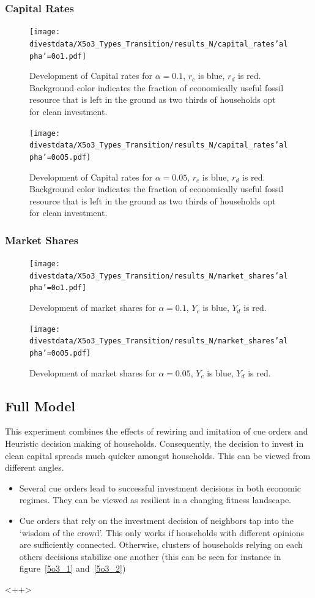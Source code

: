 \subsubsection{Capital Rates}
\begin{figure}[H]
	\centering
	\texttt{[image: divestdata/X5o3\_Types\_Transition/results\_N/capital\_rates'alpha'=0o1.pdf]}
	\caption{Development of Capital rates for $\alpha=0.1$, $r_c$ is blue, $r_d$ is red. Background color indicates the fraction of economically useful fossil resource that is left in the ground as two thirds of households opt for clean investment.}
	\label{5o3_3}
\end{figure}

\begin{figure}[H]
	\centering
	\texttt{[image: divestdata/X5o3\_Types\_Transition/results\_N/capital\_rates'alpha'=0o05.pdf]}
	\caption{Development of Capital rates for $\alpha=0.05$, $r_c$ is blue, $r_d$ is red. Background color indicates the fraction of economically useful fossil resource that is left in the ground as two thirds of households opt for clean investment.}

\end{figure}
\subsubsection{Market Shares}
\begin{figure}[H]
	\centering
	\texttt{[image: divestdata/X5o3\_Types\_Transition/results\_N/market\_shares'alpha'=0o1.pdf]}
	\caption{Development of market shares for $\alpha=0.1$, $Y_c$ is blue, $Y_d$ is red.}

\end{figure}

\begin{figure}[H]
	\centering
	\texttt{[image: divestdata/X5o3\_Types\_Transition/results\_N/market\_shares'alpha'=0o05.pdf]}
	\caption{Development of market shares for $\alpha=0.05$, $Y_c$ is blue, $Y_d$ is red.}

\end{figure}


\subsection{Full Model}
This experiment combines the effects of rewiring and imitation of cue orders and Heuristic decision making of households. Consequently, the decision to invest in clean capital spreads much quicker amongst households. This can be viewed from different angles.
\begin{itemize}
	\item Several cue orders lead to successful investment decisions in both economic regimes. They can be viewed as resilient in a changing fitness landscape.
	\item Cue orders that rely on the investment decision of neighbors tap into the `wisdom of the crowd'. This only works if households with different opinions are sufficiently connected. Otherwise, clusters of households relying on each others decisions stabilize one another (this can be seen for instance in figure~\ref{5o3_1} and~\ref{5o3_2})
\end{itemize}<++>

